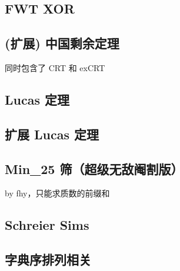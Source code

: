 \documentclass[12pt]{article}
\theoremstyle{definition}
\theoremstyle{remark}
\begin{document}


\subsection{FWT XOR}



\newpage

\subsection{(扩展) 中国剩余定理}

同时包含了 CRT 和 exCRT



\subsection{Lucas 定理}



\newpage

\subsection{扩展 Lucas 定理}



\newpage

\subsection{Min\_{}25 筛（超级无敌阉割版）}

by fhy，只能求质数的前缀和



\newpage

\subsection{Schreier Sims}



\subsection{字典序排列相关}
\end{document}

